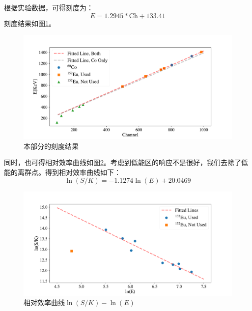 \documentclass{article}
\begin{document}
根据实验数据，可得刻度为：
\begin{equation}
    E = 1.2945*\text{Ch} + 133.41
\end{equation}
刻度结果如图\ref{fig:Full_Fit}。
\begin{figure}[htbp]
    \centering
    \includegraphics[width=\textwidth]{../plots/Full_Fit.pdf}
    \caption{本部分的刻度结果\label{fig:Full_Fit}}
\end{figure}
同时，也可得相对效率曲线如图\ref{fig:Relative}。考虑到低能区的响应不是很好，我们去除了低能的离群点。得到相对效率曲线如下：
\begin{equation}
    \ln(S/K) = -1.1274\ln(E) + 20.0469
\end{equation}
\begin{figure}[htbp]
    \centering
    \includegraphics[width=\textwidth]{../plots/Relative.pdf}
    \caption{相对效率曲线$\ln(S/K)-\ln(E)$\label{fig:Relative}}
\end{figure}
\end{document}

